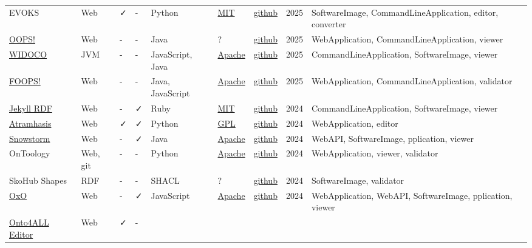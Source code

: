 \documentclass[
  DIV=10]{article}
\begin{document}
\begin{longtable}[]{@{}lllllllll@{}}
EVOKS & Web & ✓ & - & Python & \href{https://spdx.org/licenses/MIT}{MIT}
& \href{https://github.com/kit-data-manager/EVOKS}{github} & 2025 &
SoftwareImage, CommandLineApplication, editor, converter \\
\href{https://oops.linkeddata.es/}{OOPS!} & Web & - & - & Java & ? &
\href{https://github.com/oeg-upm/OOPS}{github} & 2025 & WebApplication,
CommandLineApplication, viewer \\
\href{https://github.com/dgarijo/Widoco}{WIDOCO} & JVM & - & - &
JavaScript, Java & \href{https://spdx.org/licenses/Apache-2.0}{Apache} &
\href{https://github.com/dgarijo/Widoco}{github} & 2025 &
CommandLineApplication, SoftwareImage, viewer \\
\href{https://foops.linkeddata.es/FAIR_validator.html}{FOOPS!} & Web & -
& - & Java, JavaScript &
\href{https://spdx.org/licenses/Apache-2.0}{Apache} &
\href{https://github.com/oeg-upm/fair_ontologies}{github} & 2025 &
WebApplication, CommandLineApplication, validator \\
\href{https://github.com/AKSW/jekyll-rdf}{Jekyll RDF} & Web & - & ✓ &
Ruby & \href{https://spdx.org/licenses/MIT}{MIT} &
\href{https://github.com/AKSW/jekyll-rdf}{github} & 2024 &
CommandLineApplication, SoftwareImage, viewer \\
\href{https://atramhasis.readthedocs.io/en/latest/}{Atramhasis} & Web &
✓ & ✓ & Python & \href{https://spdx.org/licenses/GPL-3.0-or-later}{GPL}
& \href{https://github.com/OnroerendErfgoed/atramhasis}{github} & 2024 &
WebApplication, editor \\
\href{https://github.com/IHTSDO/snowstorm}{Snowstorm} & Web & - & ✓ &
Java & \href{https://spdx.org/licenses/Apache-2.0}{Apache} &
\href{https://github.com/IHTSDO/snowstorm}{github} & 2024 & WebAPI,
SoftwareImage, pplication, viewer \\
OnToology & Web, git & - & - & Python &
\href{https://spdx.org/licenses/Apache-2.0}{Apache} &
\href{https://github.com/OnToology/OnToology}{github} & 2024 &
WebApplication, viewer, validator \\
SkoHub Shapes & RDF & - & - & SHACL & ? &
\href{https://github.com/skohub-io/skohub-shapes}{github} & 2024 &
SoftwareImage, validator \\
\href{https://www.ebi.ac.uk/spot/oxo/}{OxO} & Web & - & ✓ & JavaScript &
\href{https://spdx.org/licenses/Apache-2.0}{Apache} &
\href{https://github.com/EBISPOT/OXO}{github} & 2024 & WebApplication,
WebAPI, SoftwareImage, pplication, viewer \\
\href{https://onto4all.com/}{Onto4ALL Editor} & Web & ✓ & - &

\end{longtable}
\end{document}

